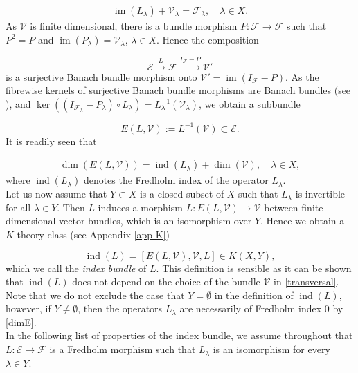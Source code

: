 \documentclass[a4paper,10pt]{article}
\DeclareMathOperator{\im}{im}
\DeclareMathOperator{\ind}{ind}
\begin{document}
\begin{align}\label{transversal}
\im(L_\lambda)+\mathcal{V}_\lambda=\mathcal{F}_\lambda,\quad\lambda\in X.
\end{align} 
As $\mathcal{V}$ is finite dimensional, there is a bundle morphism $P:\mathcal{F}\rightarrow\mathcal{F}$ such that $P^2=P$ and $\im(P_\lambda)=\mathcal{V}_\lambda$, $\lambda\in X$. Hence the composition

\[\mathcal{E}\xrightarrow{L}\mathcal{F}\xrightarrow{I_\mathcal{F}-P}\mathcal{V}'\]
is a surjective Banach bundle morphism onto $\mathcal{V}'=\im(I_\mathcal{F}-P)$. As the fibrewise kernels of surjective Banach bundle morphisms are Banach bundles (see \cite{Lang}), and $\ker((I_{\mathcal{F}_\lambda}- P_\lambda)\circ L_\lambda)=L^{-1}_\lambda(\mathcal{V}_\lambda)$, we obtain a subbundle 

\[E(L,\mathcal{V}):=L^{-1}(\mathcal{V})\subset\mathcal{E}.\]
It is readily seen that 

\begin{align}\label{dimE}
\dim(E(L,\mathcal{V}))=\ind(L_\lambda)+\dim(\mathcal{V}),\quad \lambda\in X,
\end{align}
where $\ind(L_\lambda)$ denotes the Fredholm index of the operator $L_\lambda$.\\ 
Let us now assume that $Y\subset X$ is a closed subset of $X$ such that $L_\lambda$ is invertible for all $\lambda\in Y$. Then $L$ induces a morphism $L:E(L,\mathcal{V})\rightarrow\mathcal{V}$ between finite dimensional vector bundles, which is an isomorphism over $Y$. Hence we obtain a $K$-theory class (see Appendix \ref{app-K})

\[\ind(L)=[E(L,\mathcal{V}),\mathcal{V},L]\in K(X,Y),\]
which we call the \textit{index bundle} of $L$. This definition is sensible as it can be shown that $\ind(L)$ does not depend on the choice of the bundle $\mathcal{V}$ in \eqref{transversal}. Note that we do not exclude the case that $Y=\emptyset$ in the definition of $\ind(L)$, however, if $Y\neq\emptyset$, then the operators $L_\lambda$ are necessarily of Fredholm index $0$ by \eqref{dimE}.\\
In the following list of properties of the index bundle, we assume throughout that $L:\mathcal{E}\rightarrow\mathcal{F}$ is a Fredholm morphism such that $L_\lambda$ is an isomorphism for every $\lambda\in Y$.
\end{document}
